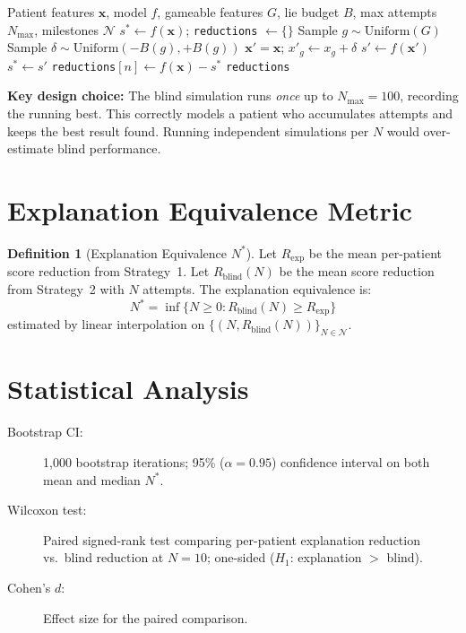 \documentclass[12pt, a4paper, oneside]{report}
\theoremstyle{definition}
\newtheorem{definition}{Definition}[chapter]
\begin{document}
\begin{algorithm}
  \caption{Blind Trial-and-Error (sequential, best-so-far)}
  \label{alg:blind}
  \begin{algorithmic}[1]
    \Require Patient features $\mathbf{x}$, model $f$, gameable features $G$,
             lie budget $B$, max attempts $N_{\max}$, milestones $\mathcal{N}$
    \State $s^* \leftarrow f(\mathbf{x})$; \texttt{reductions} $\leftarrow \{\}$
      \State Sample $g \sim \mathrm{Uniform}(G)$
      \State Sample $\delta \sim \mathrm{Uniform}(-B(g), +B(g))$
      \State $\mathbf{x}' = \mathbf{x}$; $x'_g \leftarrow x_g + \delta$
      \State $s' \leftarrow f(\mathbf{x}')$
        \State $s^* \leftarrow s'$  
      \EndIf
        \State \texttt{reductions}$[n] \leftarrow f(\mathbf{x}) - s^*$
      \EndIf
    \EndFor
    \State \Return \texttt{reductions}
  \end{algorithmic}
\end{algorithm}

\textbf{Key design choice:} The blind simulation runs \textit{once} up to
$N_{\max} = 100$, recording the running best. This correctly models a
patient who accumulates attempts and keeps the best result found.
Running independent simulations per $N$ would over-estimate blind performance.

\section{Explanation Equivalence Metric}

\begin{definition}[Explanation Equivalence $N^*$]
  Let $R_{\text{exp}}$ be the mean per-patient score reduction from
  Strategy~1. Let $R_{\text{blind}}(N)$ be the mean score reduction
  from Strategy~2 with $N$ attempts. The explanation equivalence is:
  \[
    N^* = \inf \bigl\{ N \geq 0 : R_{\text{blind}}(N) \geq R_{\text{exp}} \bigr\}
  \]
  estimated by linear interpolation on $\{(N, R_{\text{blind}}(N))\}_{N \in \mathcal{N}}$.
\end{definition}

\section{Statistical Analysis}

\begin{description}
  \item[Bootstrap CI:] 1{,}000 bootstrap iterations; 95\% ($\alpha = 0.95$)
       confidence interval on both mean and median $N^*$.
  \item[Wilcoxon test:] Paired signed-rank test comparing per-patient
       explanation reduction vs.\ blind reduction at $N=10$;
       one-sided ($H_1$: explanation $>$ blind).
  \item[Cohen's $d$:] Effect size for the paired comparison.
\end{description}
\end{document}
